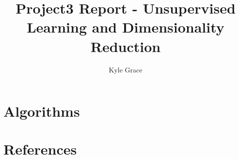 \documentclass[
	letterpaper, %
]{mlreport}
\author{Kyle Grace}
\title{Project3 Report - Unsupervised Learning and Dimensionality Reduction}
\begin{document}

\maketitle

\begin{abstract}
\end{abstract}


\section{Algorithms}


\newpage

\section{References}
\nocite{Mitchell}
\printbibliography
\end{document}
